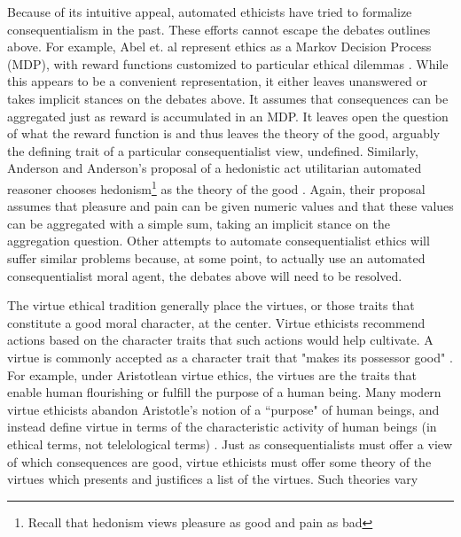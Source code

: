 \begin{isabellebody}
\begin{isamarkuptext}
Because of its intuitive appeal, automated ethicists have tried to formalize consequentialism in the past.
These efforts cannot escape the debates outlines above. For example, Abel et. al represent ethics as a
Markov Decision Process (MDP), with reward functions customized to particular ethical dilemmas 
\cite[3]{util1}. While this appears to be a convenient representation, it either leaves unanswered or 
takes implicit stances on the debates above. It assumes that consequences can be aggregated just as 
reward is accumulated in an MDP. It leaves open the question of what the reward function is and thus 
leaves the theory of the good, arguably the defining trait of a particular consequentialist view, 
undefined. Similarly, Anderson and Anderson's proposal of a hedonistic act 
utilitarian automated reasoner chooses hedonism\footnote{Recall that hedonism views pleasure as good
and pain as bad} as the theory of the good \cite[2]{util2}. Again, their proposal assumes that pleasure and pain can be 
given numeric values and that these values can be aggregated with a simple sum, taking an implicit
stance on the aggregation question. Other attempts to automate consequentialist ethics will suffer 
similar problems because, at some point, to actually use an automated consequentialist moral agent, 
the debates above will need to be resolved.%
\end{isamarkuptext}\isamarkuptrue%
%
\isadelimdocument
%
\endisadelimdocument
%
\isatagdocument
%
\isamarkuptrue%
%
\isamarkuptrue%
%
\endisatagdocument
{\isafolddocument}%
%
\isadelimdocument
%
\endisadelimdocument
%
\begin{isamarkuptext}%
The virtue ethical tradition generally place the virtues, or those traits that constitute a 
good moral character, at the center. Virtue ethicists recommend actions based on the character traits 
that such actions would help cultivate. A virtue is commonly accepted as a character trait that 
"makes its possessor good" \cite{vesep}. For example, under Aristotlean virtue ethics, the virtues 
are the traits that enable human flourishing or fulfill the purpose of a human being. Many modern 
virtue ethicists abandon Aristotle's notion of a ``purpose" of human beings, and instead define virtue 
in terms of the characteristic activity of human beings (in ethical terms, not telelological terms) \cite{snow}. 
Just as consequentialists must offer a view of which consequences are good, virtue ethicists must offer some 
theory of the virtues which presents and justifices a list of the virtues. Such theories vary

\end{isamarkuptext}
\end{isabellebody}
